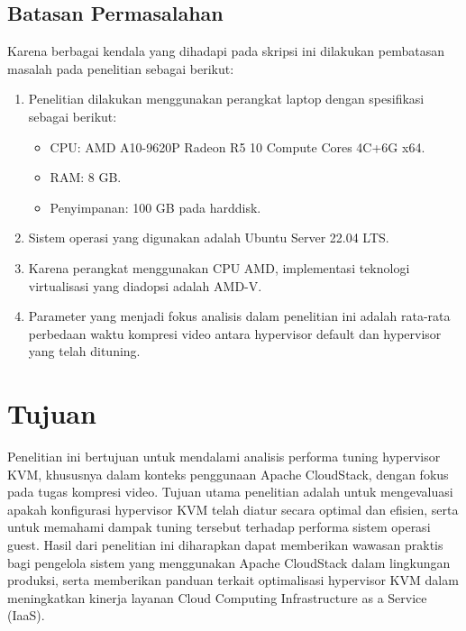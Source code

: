 \subsection{Batasan Permasalahan}
Karena berbagai kendala yang dihadapi pada skripsi ini dilakukan pembatasan masalah pada penelitian  sebagai berikut:
\begin{enumerate}
  \item Penelitian dilakukan menggunakan perangkat laptop dengan spesifikasi sebagai berikut:
  \begin{itemize}
    \item CPU: AMD A10-9620P Radeon R5 10 Compute Cores 4C+6G x64.
	\item RAM: 8 GB.
	\item Penyimpanan: 100 GB pada harddisk.
 \end{itemize}
  \item Sistem operasi yang digunakan adalah Ubuntu Server 22.04 LTS.
  \item Karena perangkat menggunakan CPU AMD, implementasi teknologi virtualisasi yang diadopsi adalah AMD-V.
  \item Parameter yang menjadi fokus analisis dalam penelitian ini adalah rata-rata perbedaan waktu kompresi video antara hypervisor default dan hypervisor yang telah dituning.
\end{enumerate}


\section{Tujuan}
Penelitian ini bertujuan untuk mendalami analisis performa tuning hypervisor KVM, khususnya dalam konteks penggunaan Apache CloudStack, dengan fokus pada tugas kompresi video. Tujuan utama penelitian adalah untuk mengevaluasi apakah konfigurasi hypervisor KVM telah diatur secara optimal dan efisien, serta untuk memahami dampak tuning tersebut terhadap performa sistem operasi guest. Hasil dari penelitian ini diharapkan dapat memberikan wawasan praktis bagi pengelola sistem yang menggunakan Apache CloudStack dalam lingkungan produksi, serta memberikan panduan terkait optimalisasi hypervisor KVM dalam meningkatkan kinerja layanan Cloud Computing Infrastructure as a Service (IaaS).



